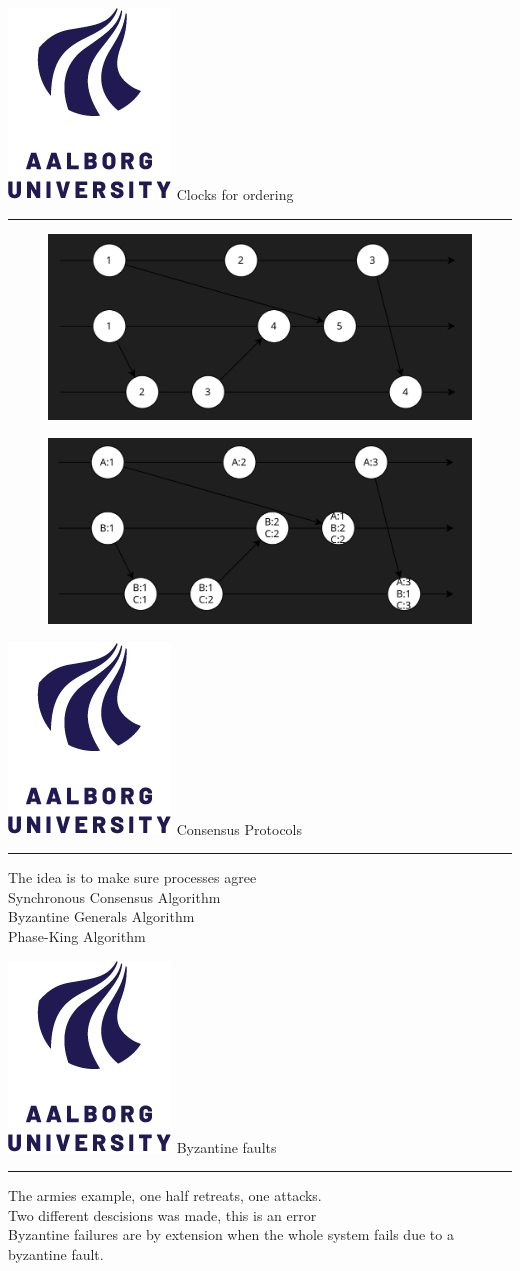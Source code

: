 \documentclass[aspectratio=1610,17pt,utf8]{beamer}
\newcommand{\mainframe}[1]{\color{blue} \includegraphics[width=.05\textwidth]{figures/aau.png} #1\\\color{black}\hrule}
\newcommand{\regularframe}[1]{\color{black}\includegraphics[width=.05\textwidth]{figures/aau.png} #1\\\hrule}
\begin{document}
\begin{frame}{\regularframe{Clocks for ordering}}
    \begin{figure}
        \includegraphics[width=.5\textwidth]{figures/2-lamport.png}
    \end{figure}
    \begin{figure}
        \includegraphics[width=.5\textwidth]{figures/2-vector.png}
    \end{figure}
\end{frame}




\begin{frame}{\mainframe{Consensus Protocols}}
    The idea is to make sure processes agree\\
    Synchronous Consensus Algorithm\\
    Byzantine Generals Algorithm\\
    Phase-King Algorithm
\end{frame}


\begin{frame}{\regularframe{Byzantine faults}}
    The armies example, one half retreats, one attacks.\\
    Two different descisions was made, this is an error\\
    Byzantine failures are by extension when the whole system fails due to a byzantine fault.
\end{frame}
\end{document}
